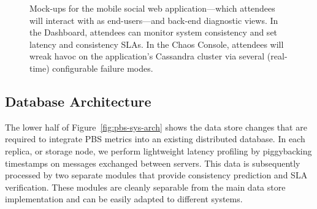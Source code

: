 \begin{figure}[tb]
\centering
\caption{Mock-ups for the mobile social web application---which
  attendees will interact with as end-users---and back-end diagnostic
  views. In the Dashboard, attendees can monitor system consistency
  and set latency and consistency SLAs. In the Chaos Console,
  attendees will wreak havoc on the application's Cassandra cluster
  via several (real-time) configurable failure modes.}
\label{fig:pbs-demo-screenshot}
\end{figure}



\subsection{Database Architecture}

The lower half of Figure~\ref{fig:pbs-sys-arch} shows the data store
changes that are required to integrate PBS metrics into an existing
distributed database. In each replica, or storage node, we perform
lightweight latency profiling by piggybacking timestamps on messages
exchanged between servers. This data is subsequently processed by two
separate modules that provide consistency prediction and SLA
verification. These modules are cleanly separable from the main data
store implementation and can be easily adapted to different systems.\\

